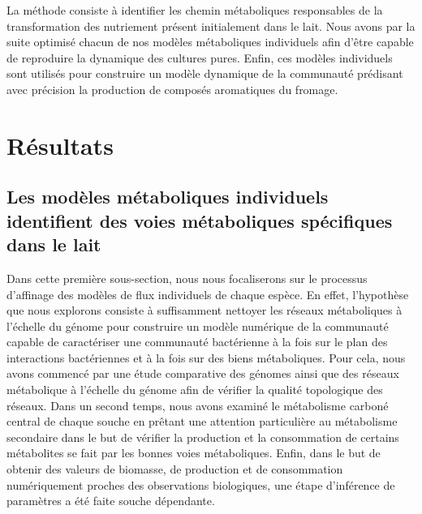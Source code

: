 \documentclass[../main.tex]{subfiles}
\begin{document}
La méthode consiste à identifier les chemin métaboliques responsables de la transformation des nutriement présent initialement dans le lait. Nous avons par la suite optimisé chacun de nos modèles métaboliques individuels afin d'être capable de reproduire la dynamique des cultures pures. Enfin, ces modèles individuels sont utilisés pour construire un modèle dynamique de la communauté prédisant avec précision la production de composés aromatiques du fromage.

\section{Résultats}
\subsection{Les modèles métaboliques individuels identifient des voies métaboliques spécifiques dans le lait}
Dans cette première sous-section, nous nous focaliserons sur le processus d'affinage des modèles de flux individuels de chaque espèce. En effet, l'hypothèse que nous explorons consiste à suffisamment nettoyer les réseaux métaboliques à l'échelle du génome pour construire un modèle numérique de la communauté capable de caractériser une communauté bactérienne à la fois sur le plan des interactions bactériennes et à la fois sur des biens métaboliques. Pour cela, nous avons commencé par une étude comparative des génomes ainsi que des réseaux métabolique à l'échelle du génome afin de vérifier la qualité topologique des réseaux. Dans un second temps, nous avons examiné le métabolisme carboné central de chaque souche en prêtant une attention particulière au métabolisme secondaire dans le but de vérifier la production et la consommation de certains métabolites se fait par les bonnes voies métaboliques. Enfin, dans le but de obtenir des valeurs de biomasse, de production et de consommation numériquement proches des observations biologiques, une étape d'inférence de paramètres a été faite souche dépendante. \\
\end{document}
